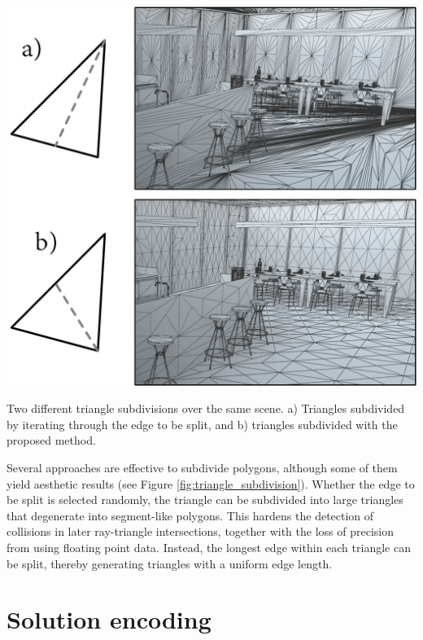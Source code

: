 \begin{marginfigure}[-5.0cm]
    \centering
    \includegraphics[width=\linewidth]{figs/lidar_optimization/triangle_subdivision.png}
	\caption{Two different triangle subdivisions over the same scene. a) Triangles subdivided by iterating through the edge to be split, and b) triangles subdivided with the proposed method.}
	\label{fig:triangle_subdivision}
\end{marginfigure}
Several approaches are effective to subdivide polygons, although some of them yield aesthetic results (see Figure \ref{fig:triangle_subdivision}). Whether the edge to be split is selected randomly, the triangle can be subdivided into large triangles that degenerate into segment-like polygons. This hardens the detection of collisions in later ray-triangle intersections, together with the loss of precision from using floating point data. Instead, the longest edge within each triangle can be split, thereby generating triangles with a uniform edge length.

\section{Solution encoding}

